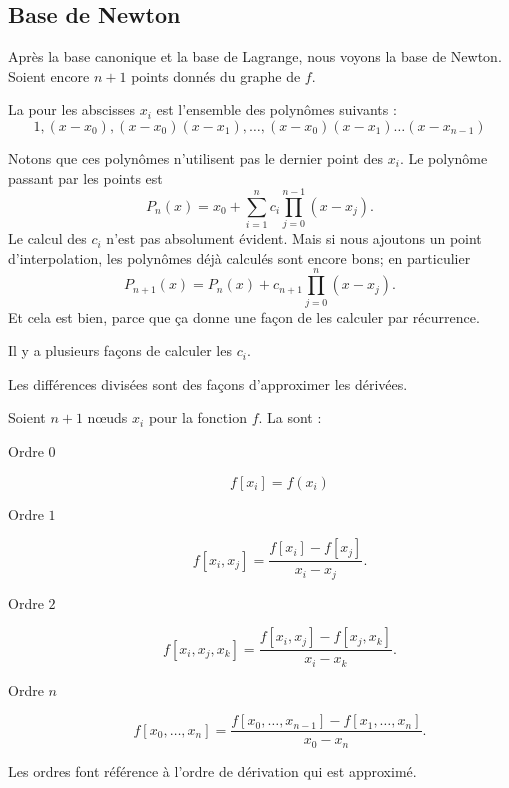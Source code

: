 \subsection{Base de Newton}

Après la base canonique et la base de Lagrange, nous voyons la base de Newton. Soient encore \( n+1\) points donnés du graphe de \( f\).

\begin{definition}
	La  pour les abscisses \( x_i\) est l'ensemble des polynômes suivants :
	\begin{equation}
		1,(x-x_0),(x-x_0)(x-x_1),\ldots,(x-x_0)(x-x_1)\ldots (x-x_{n-1})
	\end{equation}
\end{definition}
Notons que ces polynômes n'utilisent pas le dernier point des \( x_i\). Le polynôme passant par les points est
\begin{equation}
	P_n(x)=x_0+\sum_{i=1}^nc_i\prod_{j=0}^{n-1}(x-x_j).
\end{equation}
Le calcul des \( c_i\) n'est pas absolument évident. Mais si nous ajoutons un point d'interpolation, les polynômes déjà calculés sont encore bons; en particulier
\begin{equation}
	P_{n+1}(x)=P_n(x)+c_{n+1}\prod_{j=0}^{n}(x-x_j).
\end{equation}
Et cela est bien, parce que ça donne une façon de les calculer par récurrence.

Il y a plusieurs façons de calculer les \( c_i\).

Les différences divisées sont des façons d'approximer les dérivées.
\begin{definition}
	Soient \( n+1\) nœuds \( x_i\) pour la fonction \( f\). La  sont :
	\begin{description}
		\item[Ordre \( 0\)]
			\begin{equation}
				f[x_i]=f(x_i)
			\end{equation}
		\item[Ordre \( 1\)]
			\begin{equation}
				f[x_i,x_j]=\frac{ f[x_i]-f[x_j] }{ x_i-x_j }.
			\end{equation}
		\item[Ordre \( 2\)]
			\begin{equation}
				f[x_i,x_j,x_k]=\frac{ f[x_i,x_j]-f[x_j,x_k] }{ x_i-x_k }.
			\end{equation}
		\item[Ordre \( n\)]
			\begin{equation}
				f[x_0,\ldots, x_n]=\frac{ f[x_0,\ldots, x_{n-1}]-f[x_1,\ldots, x_n] }{ x_0-x_n }.
			\end{equation}
	\end{description}
\end{definition}
Les ordres font référence à l'ordre de dérivation qui est approximé.

